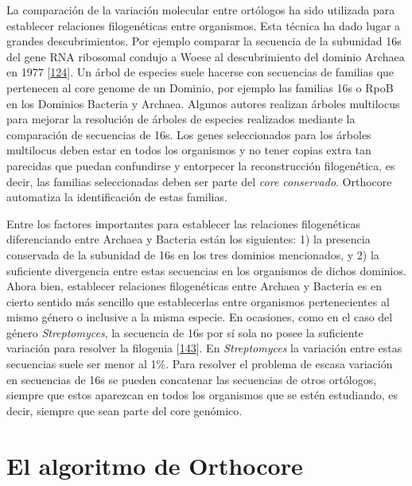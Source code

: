 \documentclass[12pt,twoside]{reedthesis}
\begin{document}
  La comparación de la variación molecular entre ortólogos ha sido
  utilizada para establecer relaciones filogenéticas entre organismos.
  Esta técnica ha dado lugar a grandes descubrimientos. Por ejemplo
  comparar la secuencia de la subunidad 16s del gene RNA ribosomal condujo
  a Woese al descubrimiento del dominio Archaea en 1977
  {[}\protect\hyperlink{ref-woese_phylogenetic_1977}{124}{]}. Un árbol de
  especies suele hacerse con secuencias de familias que pertenecen al core
  genome de un Dominio, por ejemplo las familias 16s o RpoB en los
  Dominios Bacteria y Archaea. Algunos autores realizan árboles multilocus
  para mejorar la resolución de árboles de especies realizados mediante la
  comparación de secuencias de 16s. Los genes seleccionados para los
  árboles multilocus deben estar en todos los organismos y no tener copias
  extra tan parecidas que puedan confundirse y entorpecer la
  reconstrucción filogenética, es decir, las familias seleccionadas deben
  ser parte del \emph{core conservado}. Orthocore automatiza la
  identificación de estas familias.
  
  Entre los factores importantes para establecer las relaciones
  filogenéticas diferenciando entre Archaea y Bacteria están los
  siguientes: 1) la presencia conservada de la subunidad de 16s en los
  tres dominios mencionados, y 2) la suficiente divergencia entre estas
  secuencias en los organismos de dichos dominios. Ahora bien, establecer
  relaciones filogenéticas entre Archaea y Bacteria es en cierto sentido
  más sencillo que establecerlas entre organismos pertenecientes al mismo
  género o inclusive a la misma especie. En ocasiones, como en el caso del
  género \emph{Streptomyces}, la secuencia de 16s por sí sola no posee la
  suficiente variación para resolver la filogenia
  {[}\protect\hyperlink{ref-labeda_phylogenetic_2017}{143}{]}. En
  \emph{Streptomyces} la variación entre estas secuencias suele ser menor
  al 1\%. Para resolver el problema de escasa variación en secuencias de
  16s se pueden concatenar las secuencias de otros ortólogos, siempre que
  estos aparezcan en todos los organismos que se estén estudiando, es
  decir, siempre que sean parte del core genómico.
  
  \section{El algoritmo de Orthocore}\label{el-algoritmo-de-orthocore}
  
\end{document}
